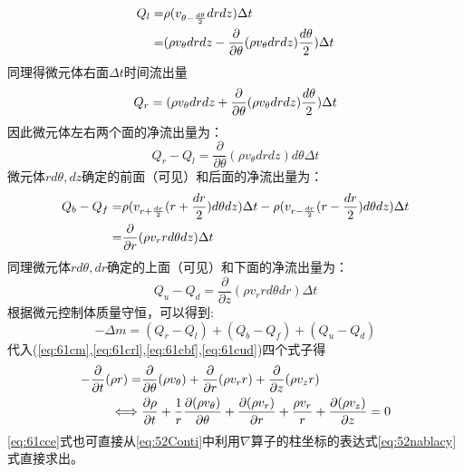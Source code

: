 \begin{align}\notag
Q_l= & \rho(v_{\theta-\frac{d\theta}{2}}drdz)\Delta t \\
=& (\rho v_{\theta}drdz-\frac{\partial}{\partial \theta}(\rho v_{\theta} drdz)\frac{d\theta}{2})\Delta t
\end{align}
同理得微元体右面$\Delta t$时间流出量
\begin{equation}
Q_r=  (\rho v_{\theta}drdz+\frac{\partial}{\partial \theta}(\rho v_{\theta} drdz)\frac{d\theta}{2})\Delta t \\
\end{equation}
因此微元体左右两个面的净流出量为：
\begin{equation}\label{eq:61crl}
Q_r-Q_l= \frac{\partial}{\partial \theta}(\rho v_{\theta} drdz)d\theta\Delta t
\end{equation}
微元体$rd\theta,dz$确定的前面（可见）和后面的净流出量为：
\begin{align}\notag
Q_b-Q_f =& \rho(v_{r+\frac{dr}{2}}(r+\frac{dr}{2})d\theta dz)\Delta t-\rho(v_{r-\frac{dr}{2}}(r-\frac{dr}{2})d\theta dz)\Delta t\\
=& \frac{\partial }{\partial r}(\rho v_r r d\theta dz)\Delta t\label{eq:61cbf}
\end{align}
同理微元体$rd\theta,dr$确定的上面（可见）和下面的净流出量为：
\begin{equation}\label{eq:61cud}
Q_u-Q_d= \frac{\partial }{\partial z}(\rho v_r rd\theta dr)\Delta t
\end{equation}
根据微元控制体质量守恒，可以得到:
\begin{equation}
-\Delta m=(Q_r-Q_l)+(Q_b-Q_f)+(Q_u-Q_d)
\end{equation}
代入(\ref{eq:61cm},\ref{eq:61crl},\ref{eq:61cbf},\ref{eq:61cud})四个式子得
\begin{align}\notag
-\frac{\partial }{\partial t}(\rho r)=&\frac{\partial }{\partial \theta}(\rho v_{\theta})+
\frac{\partial }{\partial r}(\rho v_r r)+\frac{\partial }{\partial z}(\rho v_z r)\\
\iff & \frac{\partial \rho}{\partial t}+\frac{1}{r}\frac{\partial (\rho v_{\theta})}{\partial \theta}+
\frac{\partial (\rho v_r)}{\partial r}+\frac{\rho v_r}{r}+\frac{\partial(\rho v_z) }{\partial z}=0\label{eq:61cce}
\end{align}
\eqref{eq:61cce}式也可直接从\eqref{eq:52Conti}中利用$\nabla$算子的柱坐标的表达式\eqref{eq:52nablacy}式直接求出。

